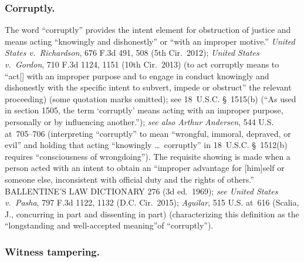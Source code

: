 \subsubsection*{Corruptly.}

The word ``corruptly'' provides the intent element for obstruction of justice and means acting ``knowingly and dishonestly'' or ``with an improper motive.''
\textit{United States v.\ Richardson}, 676 F.3d 491, 508 (5th Cir.~2012);
\textit{United States v.\ Gordon}, 710 F.3d 1124, 1151 (10th Cir.~2013) (to act corruptly means to ``act[] with an improper purpose and to engage in conduct knowingly and dishonestly with the specific intent to subvert, impede or obstruct'' the relevant proceeding) (some quotation marks omitted);
see 18~U.S.C. \S~1515(b) (``As used in section 1505, the term `corruptly' means acting with an improper purpose, personally or by influencing another.'');
\textit{see also Arthur Andersen}, 544 U.S. at~705--706 (interpreting ``corruptly'' to mean ``wrongful, immoral, depraved, or evil'' and holding that acting ``knowingly \dots\ corruptly'' in 18~U.S.C. \S~1512(b) requires ``consciousness of wrongdoing'').
The requisite showing is made when a person acted with an intent to obtain an ``improper advantage for [him]self or someone else, inconsistent with official duty and the rights of others.''
BALLENTINE'S LAW DICTIONARY 276 (3d ed.~1969);
\textit{see United States v.\ Pasha}, 797 F.3d 1122, 1132 (D.C. Cir.~2015);
\textit{Aguilar}, 515 U.S. at~616 (Scalia, J., concurring in part and dissenting in part) (characterizing this definition as the ``longstanding and well-accepted meaning''of ``corruptly'').

\subsubsection*{Witness tampering.}

